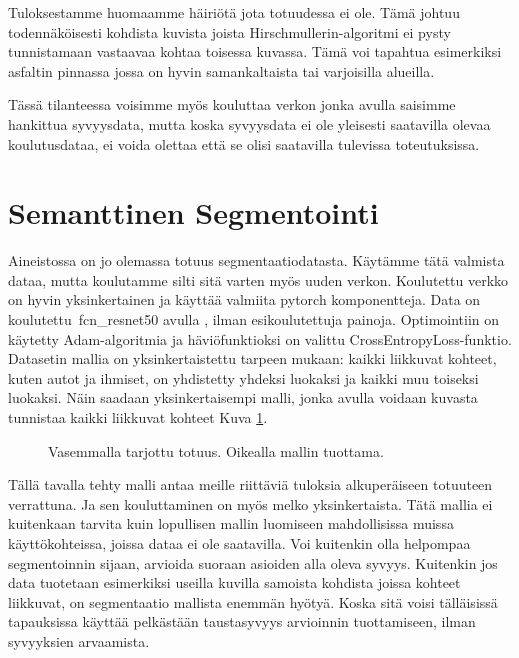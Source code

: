 Tuloksestamme huomaamme häiriötä jota totuudessa ei ole.
Tämä johtuu todennäköisesti kohdista kuvista joista Hirschmullerin-algoritmi ei pysty tunnistamaan vastaavaa kohtaa toisessa kuvassa.
Tämä voi tapahtua esimerkiksi asfaltin pinnassa jossa on hyvin samankaltaista tai varjoisilla alueilla. 

Tässä tilanteessa voisimme myös kouluttaa verkon jonka avulla saisimme hankittua syvyysdata,
mutta koska syvyysdata ei ole yleisesti saatavilla olevaa koulutusdataa,
ei voida olettaa että se olisi saatavilla tulevissa toteutuksissa. 

\section{Semanttinen Segmentointi}

Aineistossa on jo olemassa totuus segmentaatiodatasta.
Käytämme tätä valmista dataa, mutta koulutamme silti sitä varten myös uuden verkon.
Koulutettu verkko on hyvin yksinkertainen ja käyttää valmiita pytorch komponentteja.
Data on koulutettu\ fcn\_resnet50 avulla \cite{pytorchfcnresnet50}, ilman esikoulutettuja painoja. Optimointiin on käytetty Adam-algoritmia ja häviöfunktioksi on valittu CrossEntropyLoss-funktio.
Datasetin mallia on yksinkertaistettu tarpeen mukaan: kaikki liikkuvat kohteet, kuten autot ja ihmiset, on yhdistetty yhdeksi luokaksi ja kaikki muu toiseksi luokaksi.
Näin saadaan yksinkertaisempi malli, jonka avulla voidaan kuvasta tunnistaa kaikki liikkuvat kohteet Kuva \ref{fig:segmentation1}.

\begin{figure}[h]
\centering
{}
\caption[Tämä on lyhyt kuvateksti.]{Vasemmalla tarjottu totuus. Oikealla mallin tuottama.}
\label{fig:segmentation1}
\end{figure}
    

Tällä tavalla tehty malli antaa meille riittäviä tuloksia alkuperäiseen totuuteen verrattuna.
Ja sen kouluttaminen on myös melko yksinkertaista.
Tätä mallia ei kuitenkaan tarvita kuin lopullisen mallin luomiseen mahdollisissa muissa käyttökohteissa, joissa dataa ei ole saatavilla.
Voi kuitenkin olla helpompaa segmentoinnin sijaan, arvioida suoraan asioiden alla oleva syvyys.
Kuitenkin jos data tuotetaan esimerkiksi useilla kuvilla samoista kohdista joissa kohteet liikkuvat,
on segmentaatio mallista enemmän hyötyä.
Koska sitä voisi tälläisissä tapauksissa käyttää pelkästään taustasyvyys arvioinnin tuottamiseen, ilman syvyyksien arvaamista.

